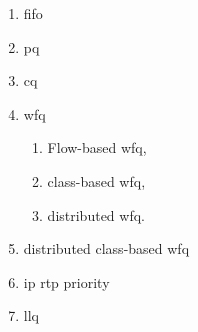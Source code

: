\begin{enumerate}
    \item \gls{fifo}
    \item \gls{pq}
    \item \gls{cq}
    \item \gls{wfq}
    \begin{enumerate}
        \item Flow-based \gls{wfq},
        \item class-based \gls{wfq},
        \item distributed \gls{wfq}.
    \end{enumerate}
    \item distributed class-based \gls{wfq}
    \item \gls{ip} \gls{rtp} priority
    \item \gls{llq}
\end{enumerate}
